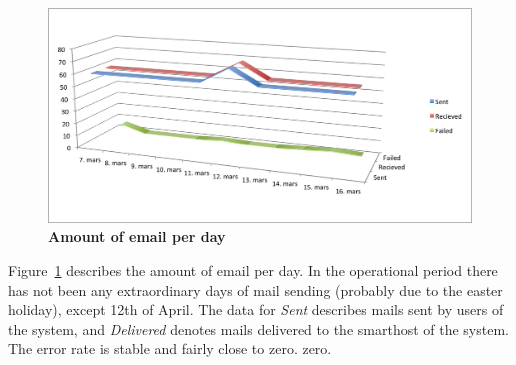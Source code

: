 \begin{figure}[h!]
  \begin{center}
    \includegraphics[scale=0.70]{img/sent-received-failed.png}
  \end{center}
  \caption{\bf{Amount of email per day}}
  \label{fig:amount}
\end{figure}
Figure~\ref{fig:amount} describes the amount of email per day. In the
operational period there has not been any extraordinary days of mail
sending (probably due to the easter holiday), except 12th of April. The
data for \emph{Sent} describes mails sent by users of the system, and
\emph{Delivered} denotes mails delivered to the smarthost of the system.
The error rate is stable and fairly close to zero.
zero.\newline
